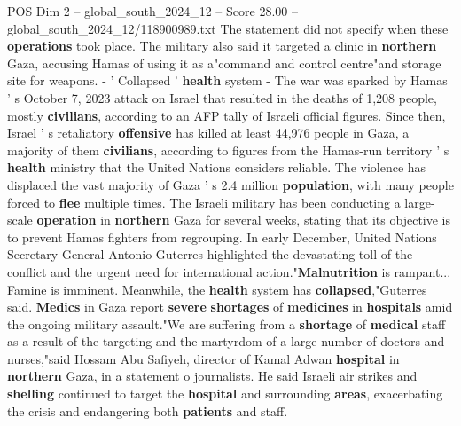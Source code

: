 \begin{textsample}{POS Dim 2 – global\_south\_2024\_12 – Score 28.00 – global\_south\_2024\_12/118900989.txt}
The statement did not specify when these \textbf{operations} took place.
The military also said it targeted a clinic in \textbf{northern} Gaza, accusing Hamas of using it as a"command and control centre"and storage site for weapons. - ' Collapsed ' \textbf{health} system - The war was sparked by Hamas ' s October 7, 2023 attack on Israel that resulted in the deaths of 1,208 people, mostly \textbf{civilians}, according to an AFP tally of Israeli official figures.
Since then, Israel ' s retaliatory \textbf{offensive} has killed at least 44,976 people in Gaza, a majority of them \textbf{civilians}, according to figures from the Hamas-run territory ' s \textbf{health} ministry that the United Nations considers reliable.
The violence has displaced the vast majority of Gaza ' s 2.4 million \textbf{population}, with many people forced to \textbf{flee} multiple times.
The Israeli military has been conducting a large-scale \textbf{operation} in \textbf{northern} Gaza for several weeks, stating that its objective is to prevent Hamas fighters from regrouping.
In early December, United Nations Secretary-General Antonio Guterres highlighted the devastating toll of the conflict and the urgent need for international action."\textbf{Malnutrition} is rampant...
Famine is imminent.
Meanwhile, the \textbf{health} system has \textbf{collapsed},"Guterres said. \textbf{Medics} in Gaza report \textbf{severe} \textbf{shortages} of \textbf{medicines} in \textbf{hospitals} amid the ongoing military assault."We are suffering from a \textbf{shortage} of \textbf{medical} staff as a result of the targeting and the martyrdom of a large number of doctors and nurses,"said Hossam Abu Safiyeh, director of Kamal Adwan \textbf{hospital} in \textbf{northern} Gaza, in a statement o journalists.
He said Israeli air strikes and \textbf{shelling} continued to target the \textbf{hospital} and surrounding \textbf{areas}, exacerbating the crisis and endangering both \textbf{patients} and staff.

\end{textsample}
